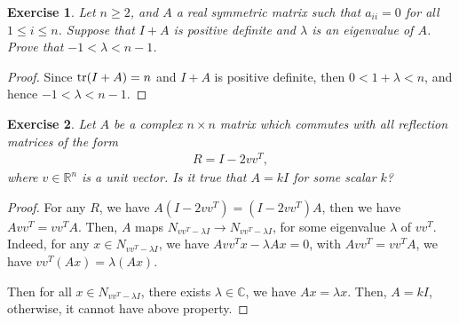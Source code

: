 \documentclass[11pt]{book}
\newtheorem{exercise}{Exercise}[section]
\theoremstyle{definition}
\numberwithin{equation}{chapter}
\begin{document}
\medskip

\begin{exercise}
Let $n \geq 2$, and $A$ a real symmetric matrix such that $a_{ii} = 0$ for all $1 \leq i \leq n$. Suppose that $I + A$ is positive definite and $\lambda$ is an eigenvalue of $A$. Prove that $-1 < \lambda < n - 1$.
\end{exercise}
\begin{proof}
Since $\tr(I + A) = n$ and $I + A$ is positive definite, then $0 < 1 + \lambda < n$, and hence $-1 < \lambda < n - 1$.
\end{proof}

\medskip

\begin{exercise}
Let $A$ be a complex $n \times n$ matrix which commutes with all reflection matrices of the form
\begin{align*}
    R = I - 2 v v^T,
\end{align*}
where $v \in \mathbb{R}^n$ is a unit vector. Is it true that $A = kI$ for some scalar $k$?
\end{exercise}
\begin{proof}
For any $R$, we have $A \left(I - 2 v v^T\right) = \left(I - 2 v v^T\right) A$, then we have $A v v^T = v v^T A$. Then, $A$ maps $N_{v v^T - \lambda I} \to N_{v v^T - \lambda I}$, for some eigenvalue $\lambda$ of $v v^T$. Indeed, for any $x \in N_{v v^T - \lambda I}$, we have $A v v^T x - \lambda Ax = 0$, with $A v v^T = v v^T A$, we have $v v^T(Ax) = \lambda (Ax)$.

Then for all $x\in N_{v v^T - \lambda I}$, there exists $\lambda \in \mathbb{C}$, we have $Ax = \lambda x$. Then, $A = kI$, otherwise, it cannot have above property.
\end{proof}

\medskip
\end{document}

